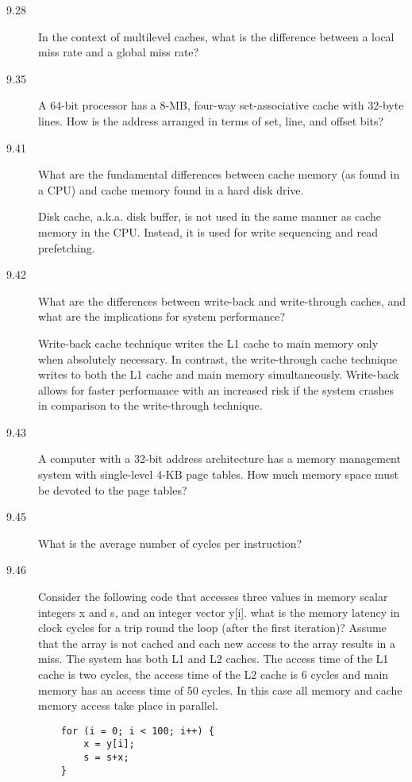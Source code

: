 \documentclass[letterpaper,10pt,titlepage]{article}
\begin{document}
\begin{description}
    
    \item[9.28] In the context of multilevel caches, what is the difference between a local miss rate and a global miss rate?
    
    
    \item[9.35] A 64-bit processor has a 8-MB, four-way set-associative cache with 32-byte lines. How is the address arranged in terms of set, line, and offset bits?
    
    
    \item[9.41] What are the fundamental differences between cache memory (as found in a CPU) and cache memory found in a hard disk drive.
    
    Disk cache, a.k.a. disk buffer, is not used in the same manner as cache memory in the CPU. Instead, it is used for write sequencing and read prefetching.
    \item[9.42]What are the differences between write-back and write-through caches, and what are the implications for system performance?
    
    Write-back cache technique writes the L1 cache to main memory only when absolutely necessary. In contrast, the write-through cache technique writes to both the L1 cache and main memory simultaneously. Write-back allows for faster performance with an increased risk if the system crashes in comparison to the write-through technique.
    \item[9.43] A computer with a 32-bit address architecture has a memory management system with single-level 4-KB page tables. How much memory space must be devoted to the page tables?
    
    
    \item[9.45] What is the average number of cycles per instruction?
    
    
    \item[9.46]Consider the following code that accesses three values in memory scalar integers x and s, and an integer vector y[i]. what is the memory latency in clock cycles for a trip round the loop (after the first iteration)? Assume that the array is not cached and each new access to the array results in a miss.
The system has both L1 and L2 caches. The access time of the L1 cache is two cycles, the access time of the L2 cache is 6 cycles and main memory has an access time of 50 cycles. In this case all memory and cache memory access take place in parallel.
	\begin{lstlisting}
    for (i = 0; i < 100; i++) {
	    x = y[i];
	    s = s+x;
	}
    \end{lstlisting}
    

\end{description}
\end{document}
